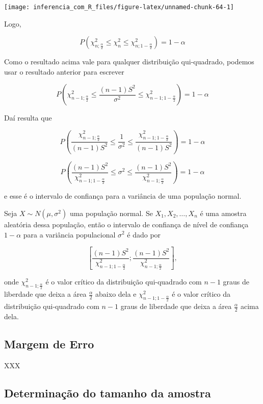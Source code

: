 \documentclass[
]{book}
\begin{document}
\begin{center}\texttt{[image: inferencia\_com\_R\_files/figure-latex/unnamed-chunk-64-1]} \end{center}

Logo,

\[P\left(\chi^2_{n;\frac{\alpha}{2}}\leq \chi^2_{n} \leq \chi^2_{n;1-\frac{\alpha}{2}}\right)=1-\alpha\]

Como o resultado acima vale para qualquer distribuição qui-quadrado, podemos usar o resultado anterior para escrever

\[P\left(\chi^2_{n-1;\frac{\alpha}{2}}\leq \frac{(n-1)S^2}{\sigma^2} \leq \chi^2_{n-1;1-\frac{\alpha}{2}}\right)=1-\alpha\]

Daí resulta que

\[P\left(\frac{\chi^2_{n-1;\frac{\alpha}{2}}}{(n-1)S^2}\leq \frac{1}{\sigma^2} \leq \frac{\chi^2_{n-1;1-\frac{\alpha}{2}}}{(n-1)S^2}\right)=1-\alpha\]

\[P\left(\frac{(n-1)S^2}{\chi^2_{n-1;1-\frac{\alpha}{2}}}\leq \sigma^2 \leq \frac{(n-1)S^2}{\chi^2_{n-1;\frac{\alpha}{2}}}\right)=1-\alpha\]

e esse é o intervalo de confiança para a variância de uma população normal.

Seja \(X\sim N(\mu,\sigma^2)\) uma população normal. Se \(X_1,X_2,\ldots,X_n\) é uma amostra aleatória dessa população, então o intervalo de confiança de nível de confiança \(1-\alpha\) para a variância populacional \(\sigma^2\) é dado por

\[\left[\frac{(n-1)S^2}{\chi^2_{n-1;1-\frac{\alpha}{2}}};\frac{(n-1)S^2}{\chi^2_{n-1;\frac{\alpha}{2}}}\right],\]

onde \(\chi^2_{n-1;\frac{\alpha}{2}}\) é o valor crítico da distribuição qui-quadrado com \(n-1\) graus de liberdade que deixa a área \(\frac{\alpha}{2}\) abaixo dela e \(\chi^2_{n-1;1-\frac{\alpha}{2}}\) é o valor crítico da distribuição qui-quadrado com \(n-1\) graus de liberdade que deixa a área \(\frac{\alpha}{2}\) acima dela.

\hypertarget{margem-de-erro-3}{%
\subsection{Margem de Erro}\label{margem-de-erro-3}}

XXX

\hypertarget{determinauxe7uxe3o-do-tamanho-da-amostra-3}{%
\subsection{Determinação do tamanho da amostra}\label{determinauxe7uxe3o-do-tamanho-da-amostra-3}}
\end{document}
